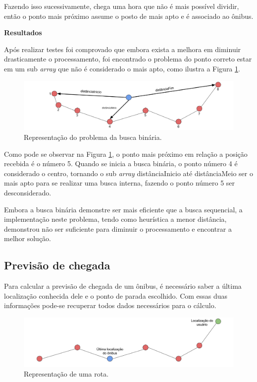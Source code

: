 \documentclass[
	12pt,				%
	oneside,			%
	a4paper,			%
	brazil				%
]{abntex2}
\begin{document}
Fazendo isso sucessivamente, chega uma hora que não é mais possível dividir, então o ponto mais próximo assume o posto de mais apto e é associado ao ônibus.

\textbf{Resultados}

Após realizar testes foi comprovado que embora exista a melhora em diminuir drasticamente o processamento, foi encontrado o problema do ponto correto estar em um sub \textit{array} que não é considerado o mais apto, como ilustra a Figura \ref{binary-search-problem}.

\begin{figure}[H]
\centering
\includegraphics[width=12cm, center]{images/busca-binaria-problema}
\caption{Representação do problema da busca binária.}
\label{binary-search-problem}
\end{figure}

Como pode se observar na Figura \ref{binary-search-problem}, o ponto mais próximo em relação a posição recebida é o número 5. Quando se inicia a busca binária, o ponto número 4 é considerado o centro, tornando o sub \textit{array} distânciaInicio até distânciaMeio ser o mais apto para se realizar uma busca interna, fazendo o ponto número 5 ser desconsiderado.

Embora a busca binária demonstre ser mais eficiente que a busca sequencial, a implementação neste problema, tendo como heurística a menor distância, demonstrou não ser suficiente para diminuir o processamento e encontrar a melhor solução.

\subsection{Previsão de chegada}

Para calcular a previsão de chegada de um ônibus, é necessário saber a última localização conhecida dele e o ponto de parada escolhido. Com essas duas informações pode-se recuperar todos dados necessários para o cálculo.

\begin{figure}[H]
\centering
\includegraphics[width=15cm, center]{images/previsao-rota}
\caption{Representação de uma rota.}
\label{Rotulo}
\end{figure}
\end{document}
